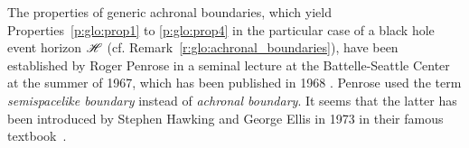 \begin{hist}
The properties of generic achronal boundaries,
which yield Properties~\ref{p:glo:prop1} to \ref{p:glo:prop4} in the particular
case of a black hole event horizon $\mathscr{H}$ (cf. Remark~\ref{r:glo:achronal_boundaries}),
have been established by
Roger Penrose in a seminal lecture at the Battelle-Seattle Center
at the summer of 1967, which has been published in 1968 \cite{Penro68}. Penrose used
the term \emph{semispacelike boundary} instead of \emph{achronal boundary}. It
seems that the latter has been introduced by Stephen Hawking and George Ellis in 1973 in their famous textbook~\cite{HawkiE73}.
\end{hist}


